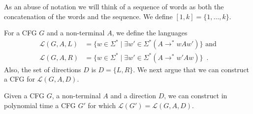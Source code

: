 \documentclass{CSML}
\newcommand{\lang}{\mathcal{L}}
\begin{document}
As an abuse of notation we will think of a sequence of words as both the concatenation of the words and the sequence.
We define $[1,k]=\{1,\dots,k\}$.

 \smallskip{}
For a CFG $G$ and a non-terminal $A$, we define the languages 
\begin{align*}
\lang(G,A,L)&=\{w\in \Sigma^*\mid \exists w'\in \Sigma^*
              (A\rightarrow^* wAw') \} \text{\ \ and} \\
\lang(G,A,R)&=
\{w\in \Sigma^*\mid \exists w'\in \Sigma^* (A\rightarrow^* w'Aw) \}\enspace .
\end{align*}
Also, the set of directions $D$ is $D=\{L,R\}$.
We next argue that we can construct a CFG for $\lang(G,A,D)$.

\begin{lem}\label{lem:L(G,A,D)}
Given a CFG $G$, a non-terminal $A$ and a direction $D$, we can construct in polynomial time 
a CFG $G'$ for which $\lang(G')=\lang(G,A,D)$.
\end{lem}
\end{document}
